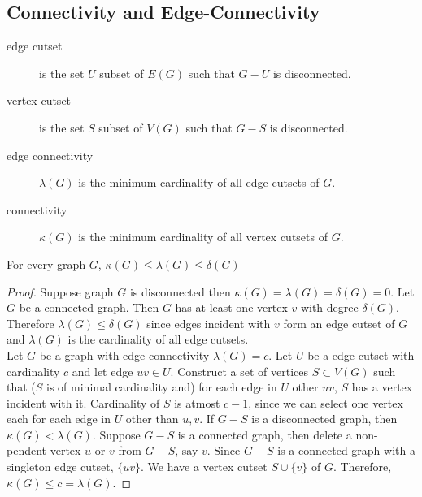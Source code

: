
\setcounter{subsection}{4}

\subsection{Connectivity and Edge-Connectivity}

\begin{description}
	\item[edge cutset] is the set $U$ subset of $E(G)$ such that $G-U$ is disconnected.
	\item[vertex cutset] is the set $S$ subset of $V(G)$ such that $G-S$ is disconnected.
	\item[edge connectivity] $\lambda(G)$ is the minimum cardinality of all edge cutsets of $G$.
	\item[connectivity] $\kappa(G)$ is the minimum cardinality of all vertex cutsets of $G$.
\end{description}

\begin{theorem}
	For every graph $G$, $\kappa(G) \le \lambda(G) \le \delta(G)$
\end{theorem}
\begin{proof}
	Suppose graph $G$ is disconnected then $\kappa(G) = \lambda(G) = \delta(G) = 0$.
	Let $G$ be a connected graph.
	Then $G$ has at least one vertex $v$ with degree $\delta(G)$.
	Therefore $\lambda(G) \le \delta(G)$ since edges incident with $v$ form an edge cutset of $G$ and $\lambda(G)$ is the cardinality of all edge cutsets.\\


	Let $G$ be a graph with edge connectivity $\lambda(G) = c$.
	Let $U$ be a edge cutset with cardinality $c$ and let edge $uv \in U$.
	Construct a set of vertices $S \subset V(G)$ such that ($S$ is of minimal cardinality and) for each edge in $U$ other $uv$, $S$ has a vertex incident with it.
	Cardinality of $S$ is atmost $c-1$, since we can select one vertex each for each edge in $U$ other than $u, v$.
	If $G-S$ is a disconnected graph, then $\kappa(G) < \lambda(G)$.
	Suppose $G-S$ is a connected graph, then delete a non-pendent vertex $u$ or $v$ from $G-S$, say $v$.
	Since $G-S$ is a connected graph with a singleton edge cutset, $\{ uv \}$.
	We have a vertex cutset $S \cup \{ v\}$ of $G$.
	Therefore, $\kappa(G) \le c = \lambda(G)$.
\end{proof}


